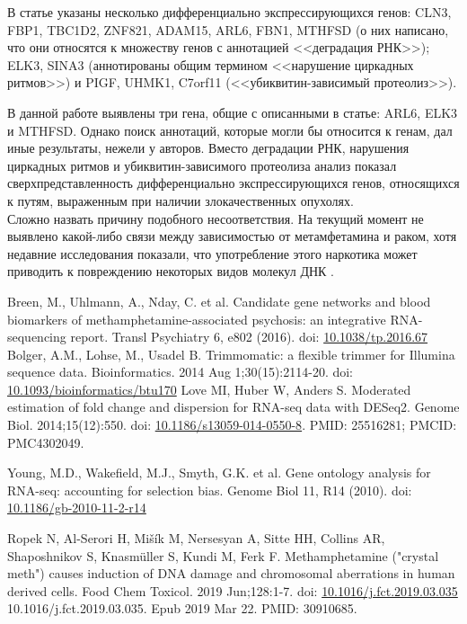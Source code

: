 \documentclass[a4paper,12pt]{article}
\begin{document}
В статье \cite{breen} указаны несколько дифференциально экспрессирующихся генов: CLN3, FBP1, TBC1D2, ZNF821, ADAM15, ARL6, FBN1, MTHFSD (о них написано, что они относятся к множеству генов с аннотацией <<деградация РНК>>); ELK3, SINA3 (аннотированы общим термином <<нарушение циркадных ритмов>>) и PIGF, UHMK1, C7orf11 (<<убиквитин-зависимый протеолиз>>).

В данной работе выявлены три гена, общие с описанными в статье: ARL6, ELK3 и MTHFSD.
Однако поиск аннотаций, которые могли бы относится к генам, дал иные результаты, нежели у авторов.
Вместо деградации РНК, нарушения циркадных ритмов и убиквитин-зависимого протеолиза анализ показал сверхпредставленность дифференциально экспрессирующихся генов, относящихся к путям, выраженным при наличии злокачественных опухолях. \\
Сложно назвать причину подобного несоответствия.
На текущий момент не выявлено какой-либо связи между зависимостью от метамфетамина и раком, хотя недавние исследования показали, что употребление этого наркотика может приводить к повреждению некоторых видов молекул ДНК \cite{ropek2019}.

\newpage
\begin{thebibliography}{99}
     Breen, M., Uhlmann, A., Nday, C. et al. Candidate gene networks and blood biomarkers of methamphetamine-associated psychosis: an integrative RNA-sequencing report. Transl Psychiatry 6, e802 (2016). doi: \href{https://doi.org/10.1038/tp.2016.67}{10.1038/tp.2016.67}
     Bolger, A.M., Lohse, M., Usadel B. Trimmomatic: a flexible trimmer for Illumina sequence data. Bioinformatics. 2014 Aug 1;30(15):2114-20. doi: \href{https://doi.org/10.1093/bioinformatics/btu170}{10.1093/bioinformatics/btu170}
     Love MI, Huber W, Anders S. Moderated estimation of fold change and dispersion for RNA-seq data with DESeq2. Genome Biol. 2014;15(12):550. doi:
    \href{https://doi.org/10.1186/s13059-014-0550-8}{10.1186/s13059-014-0550-8}. PMID: 25516281; PMCID: PMC4302049.

     Young, M.D., Wakefield, M.J., Smyth, G.K. et al. Gene ontology analysis for RNA-seq: accounting for selection bias. Genome Biol 11, R14 (2010).
    doi: \href{https://doi.org/10.1186/gb-2010-11-2-r14}{10.1186/gb-2010-11-2-r14}

     Ropek N, Al-Serori H, Mišík M, Nersesyan A, Sitte HH, Collins AR, Shaposhnikov S, Knasmüller S, Kundi M, Ferk F. Methamphetamine ("crystal meth") causes induction of DNA damage and chromosomal aberrations in human derived cells. Food Chem Toxicol. 2019 Jun;128:1-7. doi: \href{https://doi.org/10.1016/j.fct.2019.03.035}{10.1016/j.fct.2019.03.035} 10.1016/j.fct.2019.03.035. Epub 2019 Mar 22. PMID: 30910685.
\end{thebibliography}

\newpage

\end{document}
